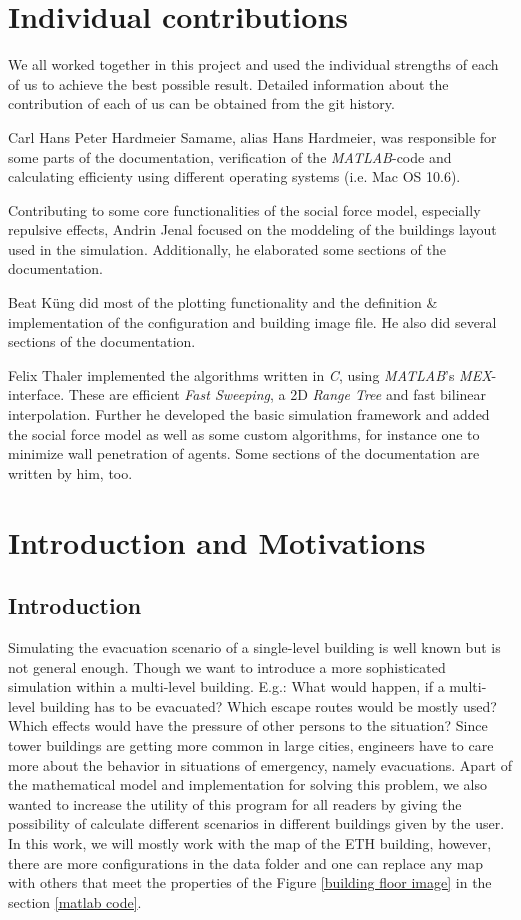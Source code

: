 \documentclass[11pt]{article}
\begin{document}
\section{Individual contributions}

We all worked together in this project and used the individual strengths of each
of us to achieve the best possible result. Detailed information about the
contribution of each of us can be obtained from the git history.

Carl Hans Peter Hardmeier Samame, alias Hans Hardmeier, was 
responsible for some parts of the documentation, verification of the
\textit{MATLAB}-code and calculating efficienty using different operating
systems (i.e. Mac OS 10.6).

Contributing to some core functionalities of the social force model, especially repulsive effects,
Andrin Jenal focused on the moddeling of the buildings layout used in the simulation.
Additionally, he elaborated some sections of the documentation.

Beat K\"ung did most of the plotting functionality and the definition \&
implementation of the configuration and building image file. He also did several
sections of the documentation.

Felix Thaler implemented the algorithms written in \textit{C}, using \textit{MATLAB}'s \textit{MEX}-interface.
These are efficient \textit{Fast Sweeping}, a 2D \textit{Range Tree} and fast bilinear interpolation.
Further he developed the basic simulation framework and added the social force model as well as some
custom algorithms, for instance one to minimize wall penetration of agents. Some sections of the documentation are
written by him, too.


\section{Introduction and Motivations}

\subsection{Introduction}

Simulating the evacuation scenario of a single-level building is well known but
is not general enough. Though we want to introduce a more sophisticated
simulation within a multi-level building. E.g.: What would happen, if a
multi-level building has to be evacuated? Which escape routes would be mostly
used? Which effects would have the pressure of other persons to the
situation? Since tower buildings are getting more common in large cities,
engineers have to care more about the behavior in situations of emergency,
namely evacuations. Apart of the mathematical model and implementation for
solving this problem, we also wanted to increase the utility of this program for
all readers by giving the possibility of calculate different scenarios in
different buildings given by the user. In this work, we will mostly work with
the map of the ETH building, however, there are more configurations in the data
folder and one can replace any map with others that meet the properties of the
Figure \ref{building floor image} in the section \ref{matlab code}.
\end{document}
